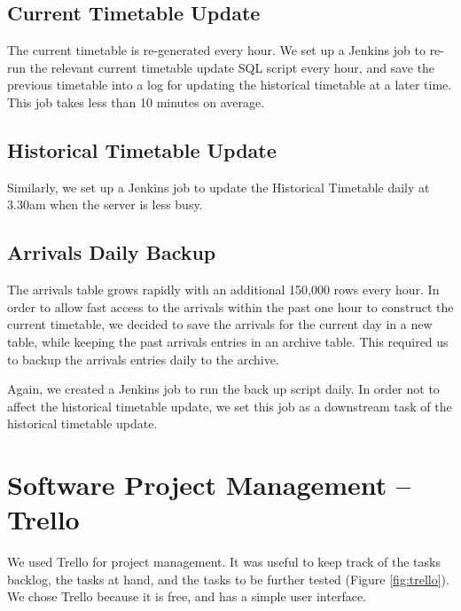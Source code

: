 \subsection{Current Timetable Update}
\par The current timetable is re-generated every hour. We set up a Jenkins job to re-run the relevant current timetable update SQL script every hour, and save the previous timetable into a log for updating the historical timetable at a later time. This job takes less than 10 minutes on average.

\subsection{Historical Timetable Update}
\par Similarly, we set up a Jenkins job to update the Historical Timetable daily at 3.30am when the server is less busy.

\subsection{Arrivals Daily Backup}
\par The arrivals table grows rapidly with an additional 150,000 rows every hour. In order to allow fast access to the arrivals within the past one hour to construct the current timetable, we decided to save the arrivals for the current day in a new table, while keeping the past arrivals entries in an archive table. This required us to backup the arrivals entries daily to the archive.

\par Again, we created a Jenkins job to run the back up script daily. In order not to affect the historical timetable update, we set this job as a downstream task of the historical timetable update.

\section{Software Project Management -- Trello}
\par We used Trello \cite{trello} for project management. It was useful to keep track of the tasks backlog, the tasks at hand, and the tasks to be further tested (Figure \ref{fig:trello}). We chose Trello because it is free, and has a simple user interface.

